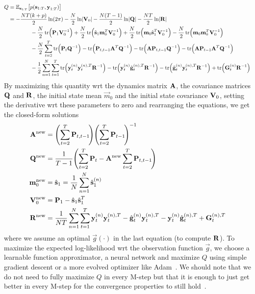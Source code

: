 	\begin{align*}
		Q
			&= \E_{\vec{s}_{1:T}}\big[ p(\vec{s}_{1:T}, \vec{y}_{1:T}) \big] \\
			&= -\frac{NT(k + p)}{2} \ln(2\pi) - \frac{N}{2} \ln \lvert \mat{V}_0 \rvert - \frac{N(T - 1)}{2} \ln \lvert \mat{Q} \rvert - \frac{NT}{2} \ln \lvert \mat{R} \rvert \\
			&\qquad\qquad -\frac{N}{2} \tr\!\Big( \mat{P}_1 \mat{V}_0^{-1} \Big) + \frac{N}{2} \tr\!\Big( \hat{\vec{s}}_1 \vec{m}_0^T \mat{V}_0^{-1} \Big) + \frac{N}{2} \tr\!\Big( \vec{m}_0 \hat{\vec{s}}_1^T \mat{V}_0^{-1} \Big) - \frac{N}{2} \tr\!\Big(\vec{m}_0 \vec{m}_0^T \mat{V}_0^{-1} \Big) \\
			&\qquad\qquad -\frac{N}{2} \sum_{t = 2}^{T} \tr\!\Big( \mat{P}_t \mat{Q}^{-1} \Big) - \tr\!\Big( \mat{P}_{t, t - 1} \mat{A}^T \mat{Q}^{-1} \Big) - \tr\!\Big( \mat{A} \mat{P}_{t, t - 1} \mat{Q}^{-1} \Big) - \tr\!\Big( \mat{A} \mat{P}_{t - 1} \mat{A}^T \mat{Q}^{-1} \Big) \\
			&\qquad\qquad -\frac{1}{2} \sum_{n = 1}^{N} \sum_{t = 1}^{T} \tr\!\Big( \vec{y}_t^{(n)} \vec{y}_t^{(n), T} \mat{R}^{-1} \Big) - \tr\!\Big( \vec{y}_t^{(n)} \hat{\vec{g}}_t^{(n), T} \mat{R}^{-1} \Big) - \tr\!\Big( \hat{\vec{g}}_t^{(n)} \vec{y}_t^{(n), T} \mat{R}^{-1} \Big) + \tr\!\Big( \mat{G}_t^{(n)} \mat{R}^{-1} \Big)
	\end{align*}
	By maximizing this quantity \ac{wrt} the dynamics matrix \(\boldsymbol{\mathrm{A}}\), the covariance matrices \(\boldsymbol{\mathrm{Q}}\) and \(\boldsymbol{\mathrm{R}}\), the initial state mean \(\vec{m}_0\) and the initial state covariance \(\boldsymbol{\mathrm{V}}_0\), \ie setting the derivative \ac{wrt} these parameters to zero and rearranging the equations, we get the closed-form solutions
	\begin{align*}
		\boldsymbol{\mathrm{A}}^{\mathrm{new}}   &= \Bigg(\! \sum_{t = 2}^{T} \boldsymbol{\mathrm{P}}_{t, t - 1} \!\Bigg) \Bigg(\! \sum_{t = 2}^{T} \boldsymbol{\mathrm{P}}_{t - 1} \!\Bigg)^{-1} \\
		\boldsymbol{\mathrm{Q}}^{\mathrm{new}}   &= \frac{1}{T - 1} \Bigg(\! \sum_{t = 2}^{T} \boldsymbol{\mathrm{P}}_t - \boldsymbol{\mathrm{A}}^{\mathrm{new}} \sum_{t = 2}^{T} \boldsymbol{\mathrm{P}}_{t, t - 1} \!\Bigg) \\
		\boldsymbol{\mathrm{m}}_0^{\mathrm{new}} &= \hat{\boldsymbol{\mathrm{s}}}_1 = \frac{1}{N} \sum_{n = 1}^{N} \hat{\boldsymbol{\mathrm{s}}}_1^{(n)} \\
		\boldsymbol{\mathrm{V}}_0^{\mathrm{new}} &= \boldsymbol{\mathrm{P}}_1 - \hat{\boldsymbol{\mathrm{s}}}_1 \hat{\boldsymbol{\mathrm{s}}}_1^T \\
		\boldsymbol{\mathrm{R}}^{\mathrm{new}}   &= \frac{1}{NT} \sum_{n = 1}^{N} \sum_{t = 1}^{T} \boldsymbol{\mathrm{y}}_t^{(n)} \boldsymbol{\mathrm{y}}_t^{(n), T} - \hat{\boldsymbol{\mathrm{g}}}_t^{(n)} \boldsymbol{\mathrm{y}}_t^{(n), T} - \boldsymbol{\mathrm{y}}_t^{(n)} \hat{\boldsymbol{\mathrm{g}}}_t^{(n), T} + \boldsymbol{\mathrm{G}}_t^{(n), T}
	\end{align*}
	where we assume an optimal \( \vec{g}(\cdot) \) in the last equation (to compute \(\boldsymbol{\mathrm{R}}\)). To maximize the expected log-likelihood \ac{wrt} the observation function \( \vec{g} \), we choose a learnable function approximator, \eg a neural network and maximize \(Q\) using simple gradient descent or a more evolved optimizer like Adam~\cite{kingmaAdamMethodStochastic2017}. We should note that we do not need to fully maximize \(Q\) in every M-step but that it is enough to just get better in every M-step for the convergence properties to still hold~\cite{dempsterMaximumLikelihoodIncomplete1977a}.

